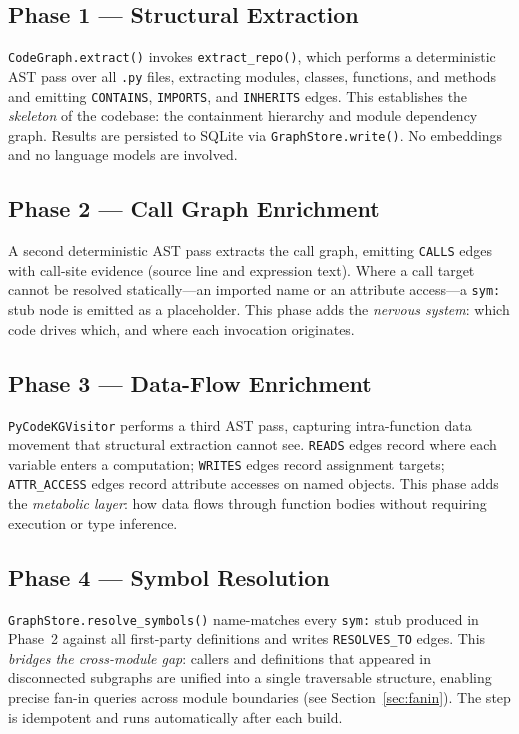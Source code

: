 \documentclass[10pt]{article}
\begin{document}
\subsection{Phase 1 --- Structural Extraction}

\texttt{CodeGraph.extract()} invokes \texttt{extract\_repo()}, which performs
a deterministic AST pass over all \texttt{.py} files, extracting modules,
classes, functions, and methods and emitting \texttt{CONTAINS},
\texttt{IMPORTS}, and \texttt{INHERITS} edges. This establishes the
\emph{skeleton} of the codebase: the containment hierarchy and module
dependency graph. Results are persisted to SQLite via
\texttt{GraphStore.write()}. No embeddings and no language models are
involved.

\subsection{Phase 2 --- Call Graph Enrichment}

A second deterministic AST pass extracts the call graph, emitting
\texttt{CALLS} edges with call-site evidence (source line and expression
text). Where a call target cannot be resolved statically---an imported name
or an attribute access---a \texttt{sym:} stub node is emitted as a
placeholder. This phase adds the \emph{nervous system}: which code drives
which, and where each invocation originates.

\subsection{Phase 3 --- Data-Flow Enrichment}

\texttt{PyCodeKGVisitor} performs a third AST pass, capturing intra-function
data movement that structural extraction cannot see. \texttt{READS} edges
record where each variable enters a computation; \texttt{WRITES} edges record
assignment targets; \texttt{ATTR\_ACCESS} edges record attribute accesses on
named objects. This phase adds the \emph{metabolic layer}: how data flows
through function bodies without requiring execution or type inference.

\subsection{Phase 4 --- Symbol Resolution}

\texttt{GraphStore.resolve\_symbols()} name-matches every \texttt{sym:} stub
produced in Phase~2 against all first-party definitions and writes
\texttt{RESOLVES\_TO} edges. This \emph{bridges the cross-module gap}: callers
and definitions that appeared in disconnected subgraphs are unified into a
single traversable structure, enabling precise fan-in queries across module
boundaries (see Section~\ref{sec:fanin}). The step is idempotent and runs
automatically after each build.
\end{document}
